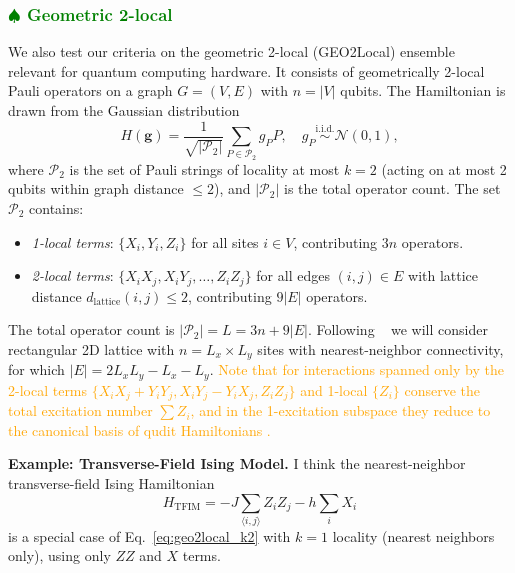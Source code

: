 \documentclass[aps,prx,reprint,superscriptaddress,footnote, twocolumn,notitlepage]{revtex4-2}
\newcommand{\tom}[1]{\textcolor{green}{#1}}
\newcommand{\ko}[1]{\textcolor{orange}{#1}}
\newcommand{\todotom}[1]{\tom{$\spadesuit$ #1}}
\begin{document}
 \subsubsection{\todotom{Geometric 2-local}} \label{sec:geo2}
 We also test our criteria on the geometric 2-local (GEO2Local) ensemble~\cite{quek2025quantumadvantagerandomgeometricallytwolocal} relevant for quantum computing hardware.
It consists of geometrically 2-local Pauli operators on a graph $G = (V, E)$ with $n = |V|$ qubits. The Hamiltonian is drawn from the Gaussian distribution
\begin{equation}
H(\mathbf{g}) = \frac{1}{\sqrt{|\mathcal{P}_2|}} \sum_{P \in \mathcal{P}_2} g_P P, \quad g_P \stackrel{\text{i.i.d.}}{\sim} \mathcal{N}(0, 1),
\label{eq:geo2local_general}
\end{equation}
where $\mathcal{P}_2$ is the set of Pauli strings of locality at most $k=2$ (acting on at most 2 qubits within graph distance $\leq 2$), and $|\mathcal{P}_2|$ is the total operator count. The set $\mathcal{P}_2$ contains:
\begin{itemize}
\item \emph{1-local terms}: $\{X_i, Y_i, Z_i\}$ for all sites $i \in V$, contributing $3n$ operators.
\item \emph{2-local terms}: $\{X_i X_j, X_i Y_j, \ldots, Z_i Z_j\}$ for all edges $(i,j) \in E$ with lattice distance $d_{\text{lattice}}(i,j) \leq 2$, contributing $9|E|$ operators.
\end{itemize}
The total operator count is $|\mathcal{P}_2| = L = 3n + 9|E|$. Following ~\cite{quek2025quantumadvantagerandomgeometricallytwolocal} we will consider rectangular 2D lattice with $n = L_x \times L_y$ sites with nearest-neighbor connectivity, for which $|E| = 2L_x L_y - L_x - L_y$. \ko{Note that for interactions spanned only by the 2-local terms $\{X_i X_j+Y_iY_j, X_iY_j-Y_iX_j,Z_iZ_j\}$ and 1-local $\{Z_i\}$ conserve the total excitation number $
\sum Z_i$, and in the 1-excitation subspace they reduce to the canonical basis of qudit Hamiltonians \cite{wang_symmetry_2012,schirmer_design_2018}.}


\textbf{Example: Transverse-Field Ising Model.} I think the nearest-neighbor transverse-field Ising Hamiltonian
\begin{equation}
H_{\text{TFIM}} = -J \sum_{\langle i,j \rangle} Z_i Z_j - h \sum_i X_i
\end{equation}
is a special case of Eq.~\eqref{eq:geo2local_k2} with $k=1$ locality (nearest neighbors only), using only $ZZ$ and $X$ terms. 
\end{document}
